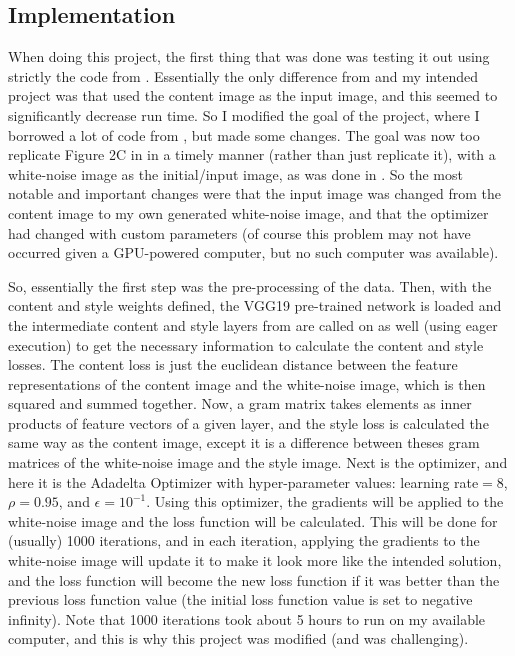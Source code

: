 \documentclass[12pt]{article}
\begin{document}
\subsection{Implementation}
When doing this project, the first thing that was done was testing it out using strictly the code from \cite{Github}. Essentially the only difference from \cite{Github} and my intended project was that \cite{Github} used the content image as the input image, and this seemed to significantly decrease run time. So I modified the goal of the project, where I borrowed a lot of code from \cite{Github}, but made some changes. The goal was now too replicate Figure 2C in \cite{Neural} in a timely manner (rather than just replicate it), with a white-noise image as the initial/input image, as was done in \cite{Neural, Image}. So the  most notable and important changes were that the input image was changed from the content image to my own generated white-noise image, and that the optimizer had changed with custom parameters (of course this problem may not have occurred given a GPU-powered computer, but no such computer was available).

So, essentially the first step was the pre-processing of the data. Then, with the content and style weights defined, the VGG19 pre-trained network is loaded and the intermediate content and style layers from \cite{Neural, Image} are called on as well (using eager execution) to get the necessary information to calculate the content and style losses. The content loss is just the euclidean distance between the feature representations  of the content image and the white-noise image, which is then squared and summed together. Now, a gram matrix takes elements as inner products of feature vectors of a given layer, and the style loss is calculated the same way as the content image, except it is a difference between theses gram matrices of the white-noise image and the style image. Next is the optimizer, and here it is the Adadelta Optimizer with hyper-parameter values: learning rate$= 8$, $\rho = 0.95$, and $\epsilon = 10^{-1}$. Using this optimizer, the gradients will be applied to the white-noise image and the loss function will be calculated. This will be done for (usually) 1000 iterations, and in each iteration, applying the gradients to the white-noise image will update it to make it look more like the intended solution, and the loss function will become the new loss function if it was better than the previous loss function value (the initial loss function value is set to negative infinity). Note that 1000 iterations took about 5 hours to run on my available computer, and this is why this project was modified (and was challenging). 
\end{document}
